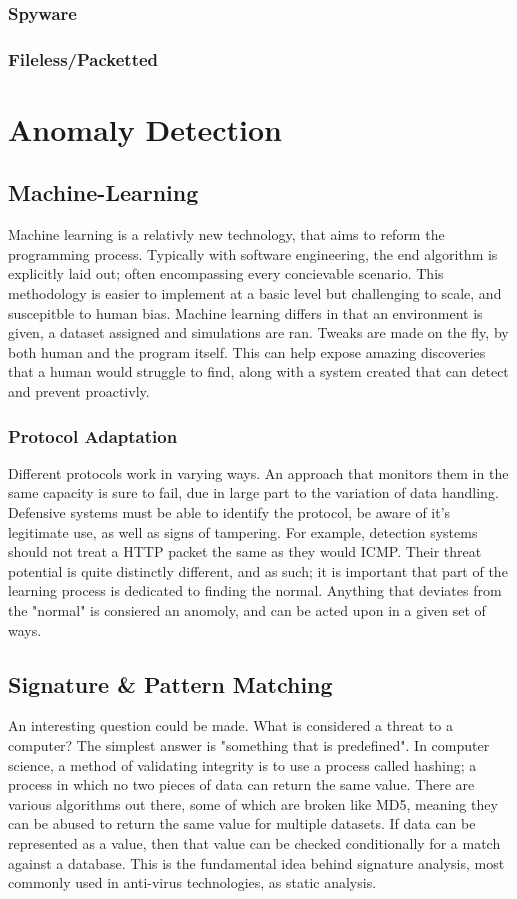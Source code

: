 \subsubsection{Spyware}
\subsubsection{Fileless/Packetted}


\section{Anomaly Detection}
\subsection{Machine-Learning}
Machine learning is a relativly new technology, that aims to reform the programming process. Typically with software engineering, the end algorithm is explicitly laid out; often encompassing every concievable scenario.
This methodology is easier to implement at a basic level but challenging to scale, and suscepitble to human bias. Machine learning differs in that an environment is given, a dataset assigned and simulations are ran. 
Tweaks are made on the fly, by both human and the program itself. This can help expose amazing discoveries that a human would struggle to find, along with a system created that can detect and prevent proactivly.
\subsubsection{Protocol Adaptation}
Different protocols work in varying ways. An approach that monitors them in the same capacity is sure to fail, due in large part to the variation of data handling. Defensive systems must be able to identify the protocol,
be aware of it's legitimate use, as well as signs of tampering. For example, detection systems should not treat a HTTP packet the same as they would ICMP. Their threat potential is quite distinctly different, and as such;
it is important that part of the learning process is dedicated to finding the normal. Anything that deviates from the "normal" is consiered an anomoly, and can be acted upon in a given set of ways.
\subsection{Signature \& Pattern Matching}
An interesting question could be made. What is considered a threat to a computer? The simplest answer is "something that is predefined". 
In computer science, a method of validating integrity is to use a process called hashing; a process in which no two pieces of data can return the same value. 
There are various algorithms out there, some of which are broken like MD5, meaning they can be abused to return the same value for multiple datasets. 
If data can be represented as a value, then that value can be checked conditionally for a match against a database. This is the fundamental idea behind signature analysis,
most commonly used in anti-virus technologies, as static analysis.

